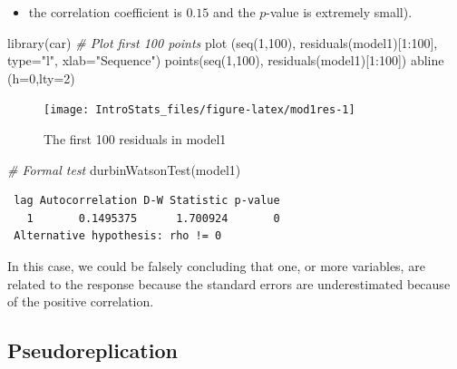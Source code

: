 \documentclass[
  oneside]{krantz}
\newenvironment{Shaded}{\begin{snugshade}}{\end{snugshade}}
\newcommand{\AttributeTok}[1]{\textcolor[rgb]{0.77,0.63,0.00}{#1}}
\newcommand{\CommentTok}[1]{\textcolor[rgb]{0.56,0.35,0.01}{\textit{#1}}}
\newcommand{\DecValTok}[1]{\textcolor[rgb]{0.00,0.00,0.81}{#1}}
\newcommand{\FunctionTok}[1]{\textcolor[rgb]{0.00,0.00,0.00}{#1}}
\newcommand{\NormalTok}[1]{#1}
\newcommand{\SpecialCharTok}[1]{\textcolor[rgb]{0.00,0.00,0.00}{#1}}
\newcommand{\StringTok}[1]{\textcolor[rgb]{0.31,0.60,0.02}{#1}}
\providecommand{\tightlist}{%
  \setlength{\itemsep}{0pt}\setlength{\parskip}{0pt}}
\begin{document}
\begin{itemize}
\tightlist
\item
  the correlation coefficient is \(0.15\) and the \(p\)-value is extremely small).
\end{itemize}

\begin{Shaded}
\begin{Highlighting}[]
\FunctionTok{library}\NormalTok{(car)}
\CommentTok{\# Plot first 100 points }
\FunctionTok{plot}\NormalTok{ (}\FunctionTok{seq}\NormalTok{(}\DecValTok{1}\NormalTok{,}\DecValTok{100}\NormalTok{), }\FunctionTok{residuals}\NormalTok{(model1)[}\DecValTok{1}\SpecialCharTok{:}\DecValTok{100}\NormalTok{], }\AttributeTok{type=}\StringTok{"l"}\NormalTok{, }\AttributeTok{xlab=}\StringTok{"Sequence"}\NormalTok{)}
\FunctionTok{points}\NormalTok{(}\FunctionTok{seq}\NormalTok{(}\DecValTok{1}\NormalTok{,}\DecValTok{100}\NormalTok{), }\FunctionTok{residuals}\NormalTok{(model1)[}\DecValTok{1}\SpecialCharTok{:}\DecValTok{100}\NormalTok{])}
\FunctionTok{abline}\NormalTok{ (}\AttributeTok{h=}\DecValTok{0}\NormalTok{,}\AttributeTok{lty=}\DecValTok{2}\NormalTok{)}
\end{Highlighting}
\end{Shaded}

\begin{figure}

{\centering \texttt{[image: IntroStats\_files/figure-latex/mod1res-1]} 

}

\caption{The first 100 residuals in model1}\label{fig:mod1res}
\end{figure}

\begin{Shaded}
\begin{Highlighting}[]
\CommentTok{\# Formal test}
\FunctionTok{durbinWatsonTest}\NormalTok{(model1)}
\end{Highlighting}
\end{Shaded}

\begin{verbatim}
 lag Autocorrelation D-W Statistic p-value
   1       0.1495375      1.700924       0
 Alternative hypothesis: rho != 0
\end{verbatim}

In this case, we could be falsely concluding that one, or more variables, are related to the response because the standard errors are underestimated because of the positive correlation.

\hypertarget{pseudoreplication}{%
\subsection{Pseudoreplication}\label{pseudoreplication}}
\end{document}
